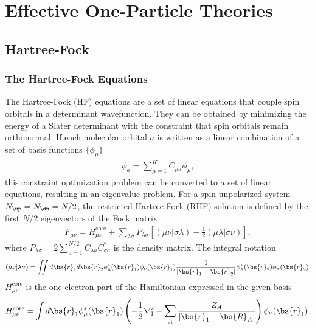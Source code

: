\section{Effective One-Particle Theories}
\subsection{Hartree-Fock}

\newcommand{\hcore}{H^{\text{core}}_{\mu\nu}}
\newcommand{\ksveff}{V^{\text{eff}}_{\mu\nu}}

\subsubsection{The Hartree-Fock Equations}
The Hartree-Fock (HF) equations are a set of linear equations that couple spin orbitals in a determinant wavefunction. They can be obtained by minimizing the energy of a Slater determinant with the constraint that spin orbitals remain orthonormal. If each molecular orbital $a$ is written as a linear combination of a set of basis functions $\{\phi_\mu\}$
\begin{align} \label{eq:hf-psia}
\psi_a = \sum\limits_{\mu=1}^K C_{\mu a} \phi_\mu,
\end{align}
this constraint optimization problem can be converted to a set of linear equations, resulting in an eigenvalue problem.
For a spin-unpolarized system $N_{\up}=N_{\dn}=N/2$, the restricted Hartree-Fock (RHF) solution is defined by the first $N/2$ eigenvectors of the Fock matrix
\begin{align}
F_{\mu\nu} = \hcore + \sum\limits_{\lambda\sigma} P_{\lambda\sigma} \left[
(\mu\nu|\sigma\lambda) - \frac{1}{2}(\mu\lambda|\sigma\nu)
\right],
\end{align} %
where $P_{\lambda\sigma}=2\sum_{a=1}^{N/2} C_{\lambda a}C_{\sigma a}^*$ is the density matrix. The integral notation
\begin{align}
(\mu\nu|\lambda\sigma) = \iint d\bs{r}_1 d\bs{r}_2 \phi_\mu^*(\bs{r}_1)\phi_{\nu}(\bs{r}_1)
\frac{1}{\vert\bs{r}_1-\bs{r}_2\vert}
\phi_\lambda^*(\bs{r}_2)\phi_\sigma(\bs{r}_2).
\end{align}
$\hcore$ is the one-electron part of the Hamiltonian expressed in the given basis %
\begin{align}
\hcore = \int d\bs{r}_1 \phi_\mu^*(\bs{r}_1)\left(
-\frac{1}{2}\nabla_1^2-\sum\limits_A \dfrac{Z_A}{\vert\bs{r}_1-\bs{R}_A\vert}
\right)  \phi_\nu(\bs{r}_1).
\end{align}
